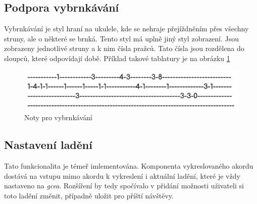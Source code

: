 \subsection*{Podpora vybrnkávání}
Vybrnkávání je styl hraní na ukulele, kde se nehraje přejíždněním přes všechny struny, ale o některé se brnká. Tento styl má uplně jiný styl zobrazení. Jsou zobrazeny jednotlivé struny a k nim čísla pražců. Tato čísla jsou rozdělena do sloupců, které odpovídají době. Příklad takové tablatury je na obrázku \ref{fig:tablature}

\begin{figure}[h!]
    \centering
    \includegraphics[width=\textwidth]{assets/picking.png}
    \caption{Noty pro vybrnkávání}
    \label{fig:tablature}
\end{figure}

\subsection*{Nastavení ladění}
Tato funkcionalita je témeř imlementována. Komponenta vykreslovaného akordu dostává na vstupu mimo akordu k vykreslení i aktuální ladění, které je vždy nastaveno na \emph{gcea}. Rozšíření by tedy spočívalo v přidání možnosti uživateli si toto ladění změnit, případně uložit pro příští návštěvy.

